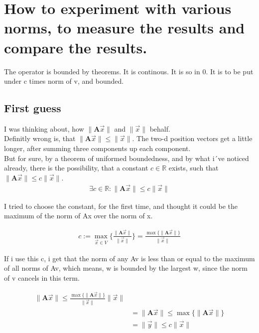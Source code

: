 \documentclass[a4paper]{article}
\begin{document}
\section{How to experiment with various norms, to measure the results and compare the results.}

The operator is bounded by theorems. It is continous. It is so in 0. It is to be put under c times norm of v, and bounded.\\

\subsection{First guess}

I was thinking about, how $\|\boldsymbol{A}\vec{x}\|$ and $\|\vec{x}\|$ behalf.\\

Definitly wrong is, that $\|\boldsymbol{A}\vec{x}\| \leq \|\vec{x}\|$. The two-d position vectors get a little longer, after summing three components up each component.\\ 

But for sure, by a theorem of uniformed boundedness, and by what i´ve noticed already,
there is the possibility, that a constant $c \in \mathbb{R}$ exists, such that $\|\boldsymbol{A}\vec{x}\| \leq c\|\vec{x}\|$.\\

\begin{displaymath}
\begin{align}
\exists c \in \mathbb{R}: \|\boldsymbol{A}\vec{x}\| \leq c\|\vec{x}\|
\end{align}
\end{displaymath}

I tried to choose the constant, for the first time, and thought it could be the maximum of the norm of Ax over the norm of x.

\begin{displaymath}
\begin{align}
c := \max_{\vec{x} \in V}\{ \frac{\|\boldsymbol{A}\vec{x}\|}{\|\vec{x}\|} \} = \frac{\max\{\|\boldsymbol{A}\vec{x}\|\}}{\|\vec{x}\|}
\end{align}
\end{displaymath}

If i use this c, i get that the norm of any Av is less than or equal to the maximum of all norms of Av, which means, w is bounded by the largest w, since the norm of v cancels in this term.

\begin{displaymath}
\begin{align}
\|\boldsymbol{A}\vec{x}\| \leq \frac{\max\{\|\boldsymbol{A}\vec{x}\|\}}{\|\vec{x}\|}\|\vec{x}\| \\
&= \|\boldsymbol{A}\vec{x}\| \leq \max\{\|\boldsymbol{A}\vec{x}\|\}\\
&= \|\vec{y}\| \leq c\|\vec{x}\| \\
\end{align}
\end{displaymath}
\end{document}
